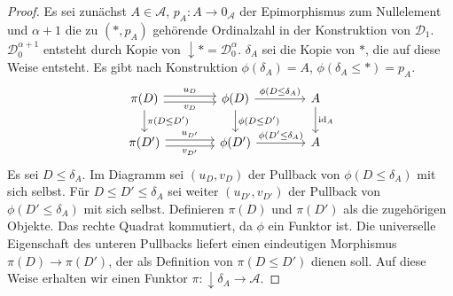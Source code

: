 \documentclass[a4paper, parskip=half]{scrartcl}
\theoremstyle{marginbreak}
\theoremstyle{nonumberplain}
\newtheorem{proof}{Beweis.}
\newcommand\cat\mathcal
\newcommand{\down}[1]{{\downarrow}#1}
\newcommand{\n}{\pgfmatrixnextcell}
\DeclareMathOperator{\id}{id}
\begin{document}
{\begin{proof}
			Es sei zunächst $A\in\cat{A}$, $p_A\colon A\to 0_\cat{A}$ der Epimorphismus
			zum Nullelement und $\alpha+1$ die zu $(*, p_A)$ gehörende Ordinalzahl
			in der Konstruktion von $\cat{D}_1$. $\cat{D}_0^{\alpha+1}$ entsteht durch
			Kopie von $\down{*}=\cat{D}_0^\alpha$. $\delta_A$ sei die Kopie von $*$,
			die auf diese Weise entsteht. Es gibt nach Konstruktion $\phi(\delta_A)=A$,
			$\phi(\delta_A\leq *)=p_A$.
			\[
				\begin{tikzcd}[column sep=4em]
					\pi(D)
						\ar[shift left]{r}{u_D}
						\ar[shift right, ']{r}{v_D}
						\ar{d}{\pi(D\leq D')} \n
					\phi(D)
						\ar{r}{\phi(D\leq\delta_A)}
						\ar{d}{\phi(D\leq D')} \n
					A
						\ar{d}{\id_A} \\
					\pi(D')
						\ar[shift left]{r}{u_{D'}}
						\ar[shift right, ']{r}{v_{D'}} \n
					\phi(D')
						\ar{r}{\phi(D'\leq\delta_A)} \n
					A
				\end{tikzcd}
			\]
			Es sei $D\leq\delta_A$. Im Diagramm sei $(u_D, v_D)$ der Pullback von $\phi(D\leq\delta_A)$ mit
			sich selbst. Für $D\leq D'\leq\delta_A$ sei weiter $(u_{D'}, v_{D'})$
			der Pullback von $\phi(D'\leq\delta_A)$ mit sich selbst. Definieren
			$\pi(D)$ und $\pi(D')$ als die zugehörigen Objekte. Das rechte
			Quadrat kommutiert, da $\phi$ ein Funktor ist. Die universelle Eigenschaft
			des unteren Pullbacks liefert einen eindeutigen Morphismus $\pi(D)\to\pi(D')$,
			der als Definition von $\pi(D\leq D')$ dienen soll. Auf diese Weise erhalten wir
			einen Funktor $\pi\colon\down{\delta_A}\to\cat{A}$.


\end{proof}}
\end{document}
